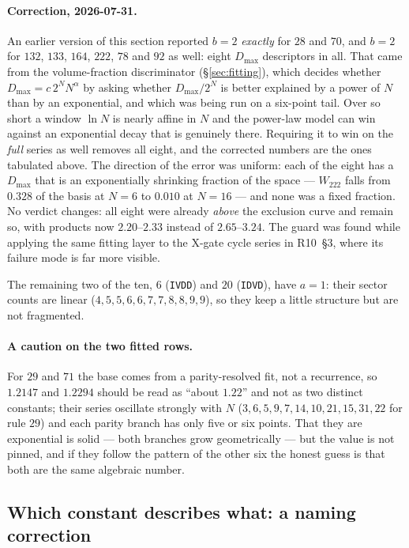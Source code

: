 \documentclass[11pt]{article}
\newcommand{\rt}[1]{\texttt{#1}}
\theoremstyle{plain}
\theoremstyle{definition}
\begin{document}
\paragraph{Correction, 2026-07-31.} An earlier version of this section reported
$b=2$ \emph{exactly} for $28$ and $70$, and $b=2$ for $132$, $133$, $164$, $222$,
$78$ and $92$ as well: eight $D_{\max}$ descriptors in all. That came from the
volume-fraction discriminator (\S\ref{sec:fitting}), which decides whether
$D_{\max}=c\,2^N N^\alpha$ by asking whether $D_{\max}/2^N$ is better explained
by a power of $N$ than by an exponential, and which was being run on a six-point
tail. Over so short a window $\ln N$ is nearly affine in $N$ and the power-law
model can win against an exponential decay that is genuinely there. Requiring it
to win on the \emph{full} series as well removes all eight, and the corrected
numbers are the ones tabulated above. The direction of the error was uniform:
each of the eight has a $D_{\max}$ that is an exponentially shrinking fraction of
the space --- $W_{222}$ falls from $0.328$ of the basis at $N=6$ to $0.010$ at
$N=16$ --- and none was a fixed fraction. No verdict changes: all eight were
already \emph{above} the exclusion curve and remain so, with products now
$2.20$--$2.33$ instead of $2.65$--$3.24$. The guard was found while applying the
same fitting layer to the X-gate cycle series in R10~\S3, where its failure mode
is far more visible.

\noindent The remaining two of the ten, $6$ (\rt{IVDD}) and $20$ (\rt{IDVD}),
have $a=1$: their sector counts are linear ($4,5,5,6,6,7,7,8,8,9,9$), so they keep
a little structure but are not fragmented.

\paragraph{A caution on the two fitted rows.} For $29$ and $71$ the base comes
from a parity-resolved fit, not a recurrence, so $1.2147$ and $1.2294$ should be
read as ``about $1.22$'' and not as two distinct constants; their series
oscillate strongly with $N$ ($3,6,5,9,7,14,10,21,15,31,22$ for rule $29$) and each
parity branch has only five or six points. That they are exponential is solid ---
both branches grow geometrically --- but the value is not pinned, and if they
follow the pattern of the other six the honest guess is that both are the same
algebraic number.

\subsection{Which constant describes what: a naming correction}
\label{sec:whichconstant}
\end{document}
